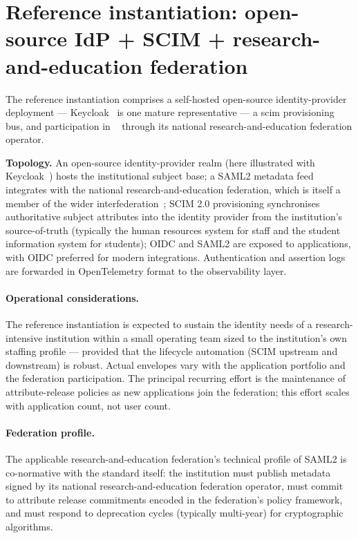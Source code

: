 \section{Reference instantiation: open-source IdP + SCIM + research-and-education federation}
\label{sec:id-reference}

The reference instantiation comprises a self-hosted open-source
identity-provider deployment --- Keycloak~\cite{keycloak} is one
mature representative --- a \gls{scim} provisioning bus,
and participation in ~\cite{edugain}
through its national research-and-education federation operator.

\begin{instantiationbox}
\noindent\textbf{Topology.} An open-source identity-provider realm
(here illustrated with Keycloak~\cite{keycloak}) hosts the
institutional subject base; a SAML2 metadata feed integrates with the
national research-and-education federation, which is itself a member of
the wider interfederation~\cite{edugain}; SCIM 2.0 provisioning
synchronises authoritative subject attributes into the identity
provider from the
institution's source-of-truth (typically the human resources system
for staff and the student information system for students); OIDC and
SAML2 are exposed to applications, with OIDC preferred for
modern integrations. Authentication and assertion logs are forwarded
in OpenTelemetry format to the observability layer.
\end{instantiationbox}

\paragraph{Operational considerations.} The reference instantiation
is expected to sustain the identity needs of a research-intensive
institution within a small operating team sized to the institution's
own staffing profile --- provided that the lifecycle
automation (SCIM upstream and downstream) is robust. Actual envelopes
vary with the application portfolio and the federation
participation. The principal recurring effort is the
maintenance of attribute-release policies as new applications join
the federation; this effort scales with application count, not user
count.

\paragraph{Federation profile.} The applicable
research-and-education federation's technical profile of
SAML2 is co-normative with the standard itself: the institution must
publish metadata signed by its national research-and-education
federation operator, must commit to
attribute release commitments encoded in the federation's policy
framework, and must respond to deprecation cycles (typically
multi-year) for cryptographic algorithms.

